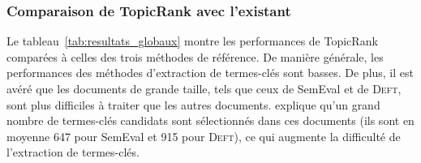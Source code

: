       \subsubsection{Comparaison de TopicRank avec l'existant}
      \label{subsubsec:main:domain_independent_keyphrase_extraction-unsupervised_automatic_keyphrase_extraction-evaluation-comparison}
        Le tableau~\ref{tab:resultats_globaux} montre les performances de
        TopicRank comparées à celles des trois méthodes de référence. De manière
        générale, les performances des méthodes d'extraction de termes-clés sont
        basses. De plus, il est avéré que les documents de grande taille, tels
        que ceux de SemEval et de \textsc{Deft}, sont plus difficiles à traiter que les
        autres documents.  explique qu'un
        grand nombre de termes-clés candidats sont sélectionnés dans ces
        documents (ils sont en moyenne 647 pour SemEval et 915 pour
        \textsc{Deft}), ce qui augmente la difficulté de l'extraction de
        termes-clés.

